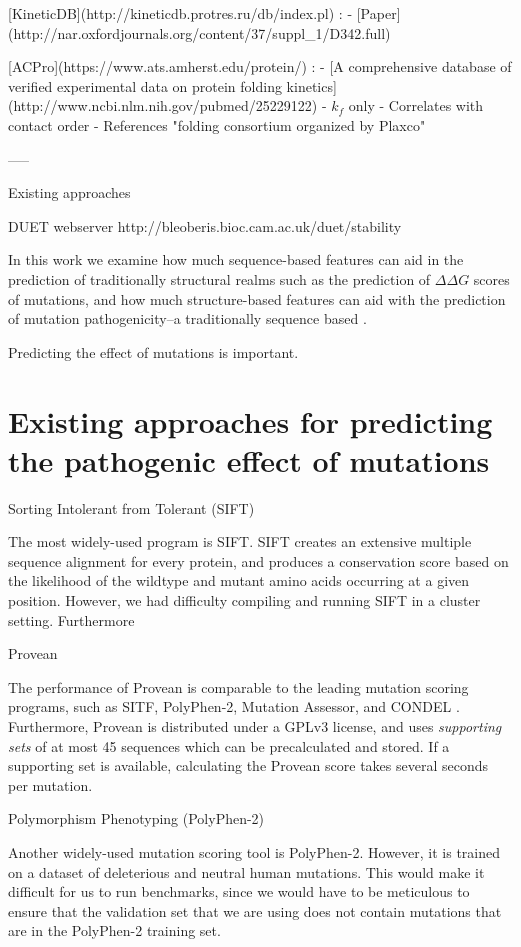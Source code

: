 [KineticDB](http://kineticdb.protres.ru/db/index.pl)
: - [Paper](http://nar.oxfordjournals.org/content/37/suppl_1/D342.full)


[ACPro](https://www.ats.amherst.edu/protein/)
: - [A comprehensive database of verified experimental data on protein folding kinetics](http://www.ncbi.nlm.nih.gov/pubmed/25229122)
  - $k_{f}$ only
  - Correlates with contact order
  - References "folding consortium organized by Plaxco"





-----


Existing approaches


DUET webserver http://bleoberis.bioc.cam.ac.uk/duet/stability

In this work we examine how much sequence-based features can aid in the prediction of traditionally structural realms such as the prediction of $\Delta \Delta G$ scores of mutations, and how much structure-based features can aid with the prediction of mutation pathogenicity--a traditionally sequence based .

Predicting the effect of mutations is important.



\section{Existing approaches for predicting the pathogenic effect of mutations}

Sorting Intolerant from Tolerant (SIFT)

The most widely-used program is SIFT. SIFT creates an extensive multiple sequence alignment for every protein, and produces a conservation score based on the likelihood of the wildtype and mutant amino acids occurring at a given position. However, we had difficulty compiling and running SIFT in a cluster setting. Furthermore


Provean

The performance of Provean is comparable to the leading mutation scoring programs, such as SITF, PolyPhen-2, Mutation Assessor, and CONDEL \cite{choi_predicting_2012}. Furthermore, Provean is distributed under a GPLv3 license, and uses \textit{supporting sets} of at most 45 sequences which can be precalculated and stored. If a supporting set is available, calculating the Provean score takes several seconds per mutation.


Polymorphism Phenotyping (PolyPhen-2)

Another widely-used mutation scoring tool is PolyPhen-2. However, it is trained on a dataset of deleterious and neutral human mutations. This would make it difficult for us to run benchmarks, since we would have to be meticulous to ensure that the validation set that we are using does not contain mutations that are in the PolyPhen-2 training set.


